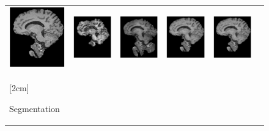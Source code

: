 \documentclass[review]{elsarticle}
\begin{document}
\begin{figure}[H]
\begin{raggedright}
\begin{tabular}{>{\centering}b{0.2cm}lcccc}
 			\includegraphics[width=2.5cm]{include/grp2/factor6/022-Guys-0701-T1/022-Guys-0701-T1_brains__50} &
			\includegraphics[width=2.5cm]{include/grp2/factor6/022-Guys-0701-T1/022-Guys-0701-T1_brains__zeroPadding_50} & \includegraphics[width=2.5cm]{include/grp2/factor6/022-Guys-0701-T1/022-Guys-0701-T1_brains__CS_50} & \includegraphics[width=2.5cm]{include/grp2/factor6/022-Guys-0701-T1/022-Guys-0701-T1_brains__CNNL2_50} & \includegraphics[width=2.5cm]{include/grp2/factor6/022-Guys-0701-T1/022-Guys-0701-T1_brains__predict_50}
			
			\tabularnewline
			
			\multirow{2}{0.2cm}[2cm]{\begin{turn}{90} {\footnotesize Segmentation} \end{turn}} & 
			

\end{tabular}
\end{raggedright}
\end{figure}
\end{document}
